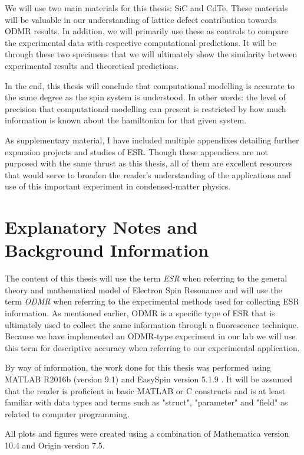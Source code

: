 \documentclass[oneside, astronomy, noacknowlegments]{BYUPhys}
\begin{document}
We will use two main materials for this thesis: SiC and CdTe. These materials will be valuable in our understanding of lattice defect contribution towards ODMR results. In addition, we will primarily use these as controls to compare the experimental data with respective computational predictions. It will be through these two specimens that we will ultimately show the similarity between experimental results and theoretical predictions.

In the end, this thesis will conclude that computational modelling is accurate to the same degree as the spin system is understood. In other words: the level of precision that computational modelling can present is restricted by how much information is known about the hamiltonian for that given system.

As supplementary material, I have included multiple appendixes detailing further expansion projects and studies of ESR. Though these appendices are not purposed with the same thrust as this thesis, all of them are excellent resources that would serve to broaden the reader's understanding of the applications and use of this important experiment in condensed-matter physics.

\section{Explanatory Notes and Background Information}

The content of this thesis will use the term \textit{ESR} when referring to the general theory and mathematical model of Electron Spin Resonance and will use the term \textit{ODMR} when referring to the experimental methods used for collecting ESR information. As mentioned earlier, ODMR is a specific type of ESR that is ultimately used to collect the same information through a fluorescence technique. Because we have implemented an ODMR-type experiment in our lab we will use this term for descriptive accuracy when referring to our experimental application.

By way of information, the work done for this thesis was performed using MATLAB R2016b (version 9.1) and EasySpin version 5.1.9 . It will be assumed that the reader is proficient in basic MATLAB or C constructs and is at least familiar with data types and terms such as "struct", "parameter" and "field" as related to computer programming.

All plots and figures were created using a combination of Mathematica version 10.4 and Origin version 7.5.
\end{document}
